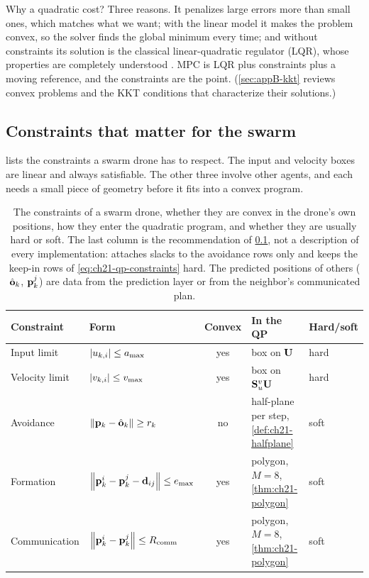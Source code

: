 Why a quadratic cost? Three reasons. It penalizes large errors more than small
ones, which matches what we want; with the linear model it makes the problem
convex, so the solver finds the global minimum every time; and without
constraints its solution is the classical linear-quadratic regulator (LQR),
whose properties are completely understood \cite{rawlings2017mpc}. MPC is LQR
plus constraints plus a moving reference, and the constraints are the point.
(\cref{sec:appB-kkt} reviews convex problems and the KKT conditions that
characterize their solutions.)

\subsection{Constraints that matter for the swarm}
\label{sec:ch21-constraints}

 lists the constraints a swarm drone has to
respect. The input and velocity boxes are linear and always satisfiable. The
other three involve other agents, and each needs a small piece of geometry
before it fits into a convex program.

\begin{table}[tb]
\centering\small
\caption{The constraints of a swarm drone, whether they are convex in the
drone's own positions, how they enter the quadratic program, and whether they
are usually hard or soft. The last column is the recommendation of
\cref{sec:ch21-constraints}, not a description of every implementation:
 attaches slacks to the avoidance rows only and keeps the
keep-in rows of \cref{eq:ch21-qp-constraints} hard. The predicted positions of others
($\hat{\mathbf{o}}_k$, $\mathbf{p}_k^{j}$) are data from the prediction layer or from
the neighbor's communicated plan.}
\label{tab:ch21-constraints}
\begin{tabular}{@{}llcll@{}}
\toprule
Constraint & Form & Convex & In the QP & Hard/soft\\
\midrule
Input limit & $\left\lvert u_{k,i} \right\rvert\le a_{\max}$ & yes & box on $\mathbf{U}$ & hard\\
Velocity limit & $\left\lvert v_{k,i} \right\rvert\le v_{\max}$ & yes & box on $\mathbf{S}_u^{v}\mathbf{U}$ & hard\\
Avoidance & $\left\lVert \mathbf{p}_k-\hat{\mathbf{o}}_k \right\rVert\ge r_k$ & no & half-plane per step, \cref{def:ch21-halfplane} & soft\\
Formation & $\left\lVert \mathbf{p}_k^{i}-\mathbf{p}_k^{j}-\mathbf{d}_{ij} \right\rVert\le e_{\max}$ & yes & polygon, $M=8$, \cref{thm:ch21-polygon} & soft\\
Communication & $\left\lVert \mathbf{p}_k^{i}-\mathbf{p}_k^{j} \right\rVert\le R_{\mathrm{comm}}$ & yes & polygon, $M=8$, \cref{thm:ch21-polygon} & soft\\
\bottomrule
\end{tabular}
\end{table}

